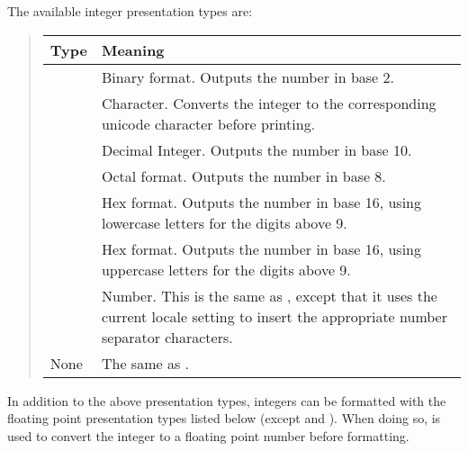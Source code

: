 \documentclass[letterpaper,10pt,english]{sphinxmanual}
\begin{document}
The available integer presentation types are:
\begin{quote}


\begin{savenotes}\sphinxattablestart
\centering
\begin{tabulary}{\linewidth}[t]{|T|T|}
\hline
\sphinxstyletheadfamily
Type
&\sphinxstyletheadfamily
Meaning
\\
\hline
{}
&
Binary format. Outputs the number in base 2.
\\
\hline
{}
&
Character. Converts the integer to the corresponding
unicode character before printing.
\\
\hline
{}
&
Decimal Integer. Outputs the number in base 10.
\\
\hline
{}
&
Octal format. Outputs the number in base 8.
\\
\hline
{}
&
Hex format. Outputs the number in base 16, using
lower\sphinxhyphen{}case letters for the digits above 9.
\\
\hline
{}
&
Hex format. Outputs the number in base 16, using
upper\sphinxhyphen{}case letters for the digits above 9.
\\
\hline
{}
&
Number. This is the same as , except that it uses
the current locale setting to insert the appropriate
number separator characters.
\\
\hline
None
&
The same as .
\\
\hline
\end{tabulary}
\par
\sphinxattableend\end{savenotes}
\end{quote}

In addition to the above presentation types, integers can be formatted
with the floating point presentation types listed below (except
 and ). When doing so,  is used to convert the
integer to a floating point number before formatting.
\end{document}

